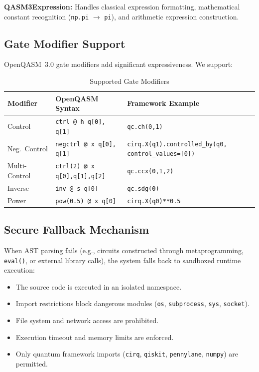 \documentclass[conference]{IEEEtran}
\begin{document}
\textbf{QASM3Expression:} Handles classical expression formatting, mathematical constant recognition (\texttt{np.pi} $\rightarrow$ \texttt{pi}), and arithmetic expression construction.

\subsection{Gate Modifier Support}

OpenQASM~3.0 gate modifiers add significant expressiveness. We support:

\begin{table}[t]
\centering
\caption{Supported Gate Modifiers}
\label{tab:modifiers}
\begin{tabular}{@{}lll@{}}
\toprule
\textbf{Modifier} & \textbf{OpenQASM Syntax} & \textbf{Framework Example} \\
\midrule
Control         & \texttt{ctrl @ h q[0], q[1]}        & \texttt{qc.ch(0,1)} \\
Neg.\ Control   & \texttt{negctrl @ x q[0], q[1]}     & \texttt{cirq.X(q1).controlled\_by(q0, control\_values=[0])} \\
Multi-Control   & \texttt{ctrl(2) @ x q[0],q[1],q[2]} & \texttt{qc.ccx(0,1,2)} \\
Inverse         & \texttt{inv @ s q[0]}               & \texttt{qc.sdg(0)} \\
Power           & \texttt{pow(0.5) @ x q[0]}          & \texttt{cirq.X(q0)**0.5} \\
\bottomrule
\end{tabular}
\end{table}

\subsection{Secure Fallback Mechanism}

When AST parsing fails (e.g., circuits constructed through metaprogramming, \texttt{eval()}, or external library calls), the system falls back to sandboxed runtime execution:

\begin{itemize}
    \item The source code is executed in an isolated namespace.
    \item Import restrictions block dangerous modules (\texttt{os}, \texttt{subprocess}, \texttt{sys}, \texttt{socket}).
    \item File system and network access are prohibited.
    \item Execution timeout and memory limits are enforced.
    \item Only quantum framework imports (\texttt{cirq}, \texttt{qiskit}, \texttt{pennylane}, \texttt{numpy}) are permitted.
\end{itemize}
\end{document}

